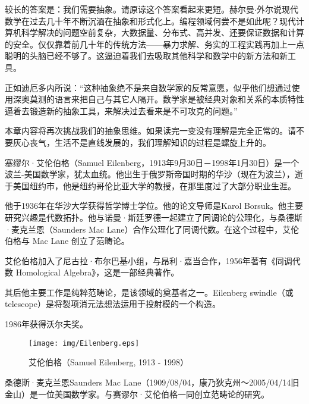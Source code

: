 \documentclass{article}
\begin{document}
较长的答案是：我们需要抽象。请原谅这个答案看起来更短。赫尔曼$\cdot$外尔说现代数学在过去几十年不断沉湎在抽象和形式化上。编程领域何尝不是如此呢？现代计算机科学解决的问题空前复杂，大数据量、分布式、高并发、还要保证数据和计算的安全。仅仅靠着前几十年的传统方法——暴力求解、务实的工程实践再加上一点聪明的头脑已经不够了。这逼迫着我们去吸取其他科学和数学中的新方法和新工具。

正如迪厄多内所说：“这种抽象绝不是来自数学家的反常意愿，似乎他们想通过使用深奥莫测的语言来把自己与其它人隔开。数学家是被经典对象和关系的本质特性逼着去锻造新的抽象工具，来解决过去看来是不可攻克的问题。”\cite{Dieudonne1987}

本章内容将再次挑战我们的抽象思维。如果读完一变没有理解是完全正常的。请不要灰心丧气，生活不是直线发展的，我们理解知识的过程是螺旋上升的。

塞缪尔·艾伦伯格（Samuel Eilenberg，1913年9月30日－1998年1月30日）是一个波兰-美国数学家，犹太血统。他出生于俄罗斯帝国时期的华沙（现在为波兰），逝于美国纽约市，他是纽约哥伦比亚大学的教授，在那里度过了大部分职业生涯。

他于1936年在华沙大学获得哲学博士学位。他的论文导师是Karol Borsuk。他主要研究兴趣是代数拓扑。他与诺曼·斯廷罗德一起建立了同调论的公理化，与桑德斯·麦克兰恩（Saunders Mac Lane）合作公理化了同调代数。在这个过程中，艾伦伯格与 Mac Lane 创立了范畴论。

艾伦伯格加入了尼古拉·布尔巴基小组，与昂利·嘉当合作，1956年著有《同调代数 Homological Algebra》，这是一部经典著作。

其后他主要工作是纯粹范畴论，是该领域的奠基者之一。Eilenberg swindle（或 telescope）是将裂项消元法想法运用于投射模的一个构造。

1986年获得沃尔夫奖。

\begin{wrapfigure}{R}{0.3\textwidth}
 \centering
 \texttt{[image: img/Eilenberg.eps]}
 \captionsetup{labelformat=empty}
 \caption{艾伦伯格（Samuel Eilenberg, 1913 - 1998）}
 \label{fig:Pythagoras}
\end{wrapfigure}

桑德斯·麦克兰恩Saunders Mac Lane（1909/08/04，康乃狄克州～2005/04/14旧金山）是一位美国数学家。与赛谬尔·艾伦伯格一同创立范畴论的研究。
\end{document}
